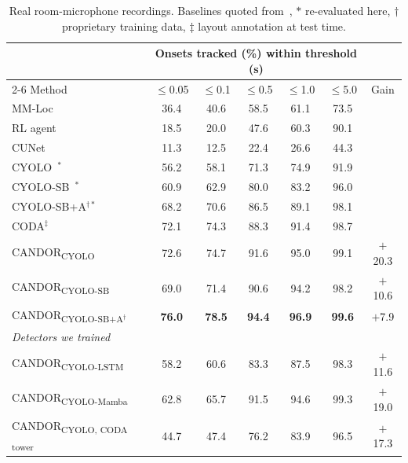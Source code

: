 \documentclass{article}
\newcommand{\syson}[1]{CANDOR\textsubscript{#1}}
\begin{document}
\begin{table}[t]
\centering
\caption{Real room-microphone recordings. Baselines quoted
from~\cite{yang2026coda}, $*$ re-evaluated here, $\dagger$ proprietary
training data, $\ddagger$ layout annotation at test time.}
\label{tab:main}
\setlength{\tabcolsep}{2.2pt}
{\scriptsize
\begin{tabular}{lcccccc}
\toprule
& \multicolumn{5}{c}{Onsets tracked (\%) within threshold (s)} & \\
\cmidrule(lr){2-6}
Method & $\le$0.05 & $\le$0.1 & $\le$0.5 & $\le$1.0 & $\le$5.0 & Gain \\
\midrule
MM-Loc~\cite{dorfer2016}                         & 36.4 & 40.6 & 58.5 & 61.1 & 73.5 & \\
RL agent~\cite{henkel2019rl}                     & 18.5 & 20.0 & 47.6 & 60.3 & 90.1 & \\
CUNet~\cite{henkel2020cunet}                     & 11.3 & 12.5 & 22.4 & 26.6 & 44.3 & \\
CYOLO~\cite{henkel2021eusipco}$^{*}$             & 56.2 & 58.1 & 71.3 & 74.9 & 91.9 & \\
CYOLO-SB~\cite{henkel2021frontiers}$^{*}$        & 60.9 & 62.9 & 80.0 & 83.2 & 96.0 & \\
CYOLO-SB+A$^{\dagger*}$~\cite{henkel2021frontiers} & 68.2 & 70.6 & 86.5 & 89.1 & 98.1 & \\
CODA$^\ddagger$~\cite{yang2026coda}              & 72.1 & 74.3 & 88.3 & 91.4 & 98.7 & \\
\midrule
\syson{CYOLO}                                           & 72.6 & 74.7 & 91.6 & 95.0 & 99.1 & $+$20.3 \\
\syson{CYOLO-SB}                                     & 69.0 & 71.4 & 90.6 & 94.2 & 98.2 & $+$10.6 \\
\syson{CYOLO-SB+A$^\dagger$}                   & \textbf{76.0} & \textbf{78.5} & \textbf{94.4} & \textbf{96.9} & \textbf{99.6} & $+$7.9 \\
\midrule
\multicolumn{7}{l}{\emph{Detectors we trained}}\\
\syson{CYOLO-LSTM}                             & 58.2 & 60.6 & 83.3 & 87.5 & 98.3 & $+$11.6 \\
\syson{CYOLO-Mamba}                            & 62.8 & 65.7 & 91.5 & 94.6 & 99.3 & $+$19.0 \\
\syson{CYOLO, CODA tower}~\cite{yang2026coda} & 44.7 & 47.4 & 76.2 & 83.9 & 96.5 & $+$17.3 \\
\bottomrule
\end{tabular}}
\end{table}
\end{document}
